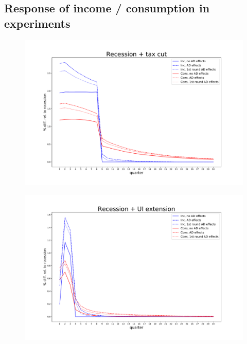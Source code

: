 \documentclass[]{article}
\begin{document}
\subsection{Response of income / consumption in experiments}

\begin{figure}
	\centering
	\includegraphics[width=\linewidth]{../Full_Run_3Educ_Oct24th/recession_taxcut_relrecession}
	\caption{}
	\label{fig:recessiontaxcutrelrecession}
\end{figure}
\begin{figure}
	\centering
	\includegraphics[width=\linewidth]{../Full_Run_3Educ_Oct24th/recession_UI_relrecession}
	\caption{}
	\label{fig:recessionuirelrecession}
\end{figure}
\end{document}
